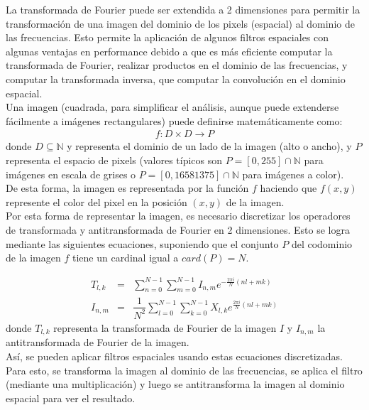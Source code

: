 \documentclass[11pt,a4paper]{emulateapj}
\begin{document}
La transformada de Fourier puede ser extendida a 2 dimensiones para permitir la transformación de una imagen 
del dominio de los pixels (espacial) al dominio de las frecuencias. Esto permite la aplicación de algunos filtros
espaciales con algunas ventajas en performance debido a que es más eficiente computar la transformada
de Fourier, realizar productos en el dominio de las frecuencias, y computar la transformada inversa,
que computar la convolución en el dominio espacial.\citet*{bou98} \\

Una imagen (cuadrada, para simplificar el análisis, aunque puede extenderse fácilmente a imágenes rectangulares)
puede definirse matemáticamente como:
\begin{eqnarray}
f:D \times D \rightarrow P
\end{eqnarray}
donde $D \subseteq  \mathbb{N} $ y representa el dominio de un lado de la imagen (alto o ancho), 
y $P$ representa el espacio de pixels (valores típicos son $P=[0,255]\cap\mathbb{N}$ para imágenes
en escala de grises o $P=[0,16581375]\cap\mathbb{N}$ para imágenes a color). \\

De esta forma, la imagen es representada por la función $f$ haciendo que $f(x,y)$ represente el color
del pixel en la posición $(x,y)$ de la imagen. \\

Por esta forma de representar la imagen, es necesario discretizar los operadores de transformada y 
antitransformada de Fourier en 2 dimensiones. Esto se logra mediante las siguientes ecuaciones, suponiendo que el conjunto $P$ del codominio de la imagen $f$ tiene un cardinal igual a $card(P)= N$.

\begin{eqnarray}
T_{l,k} &=& \sum_{n=0}^{N-1}\sum_{m=0}^{N-1} I_{n,m}e^{-\frac{2\pi i}{N}(nl+mk)} \\
I_{n,m} &=& \dfrac{1}{N^2}\sum_{l=0}^{N-1}\sum_{k=0}^{N-1} X_{l,k}e^{\frac{2\pi i}{N}(nl+mk)} 
\end{eqnarray}
donde $T_{l,k} $ representa la transformada de Fourier de la imagen $I$ y $I_{n,m} $ la antitransformada de Fourier de la imagen.\\

Así, se pueden aplicar filtros espaciales usando estas ecuaciones discretizadas. Para esto, se transforma la imagen
al dominio de las frecuencias, se aplica el filtro (mediante una multiplicación) y luego se antitransforma la imagen
al dominio espacial para ver el resultado.
\end{document}
